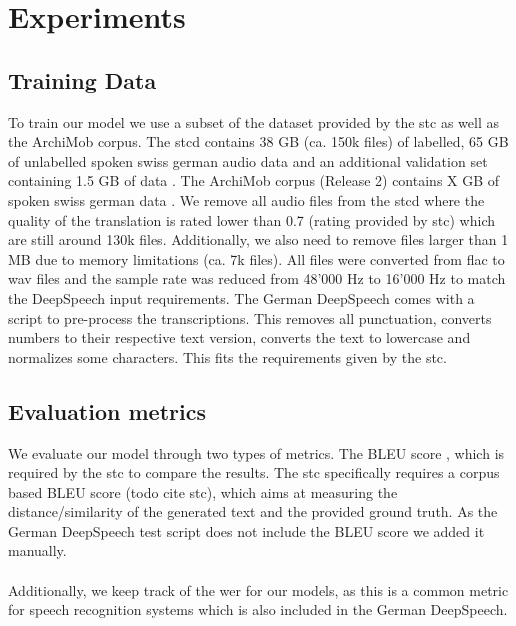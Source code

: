 \section{Experiments}

\subsection{Training Data}
To train our model we use a subset of the dataset provided by the \gls{stc} as well as the ArchiMob corpus. The \gls{stcd} contains 38 GB (ca. 150k files) of labelled, 65 GB of unlabelled spoken swiss german audio data and an additional validation set
containing 1.5 GB of data \cite{stc2019}. The ArchiMob corpus (Release 2) contains X GB of spoken swiss german data \cite{archimob2016}. We remove all audio files from the \gls{stcd} where the quality of the translation
is rated lower than 0.7 (rating provided by \gls{stc}) which are still around 130k files. Additionally, we also need to remove files larger than 1 MB due to memory limitations (ca. 7k files). All files were converted from flac to wav files and the sample rate was reduced from 48'000 Hz to 16'000 Hz to match the DeepSpeech input requirements.
The German DeepSpeech comes with a script to pre-process the transcriptions. This removes all punctuation, converts numbers to their respective text version, converts the text to lowercase and normalizes some characters. This fits the requirements given by the \gls{stc}.

\subsection{Evaluation metrics}
We evaluate our model through two types of metrics. The BLEU score \cite{Papineni2002BleuAM}, which is required by the \gls{stc} to compare the results. The \gls{stc} specifically requires a corpus
based BLEU score (todo cite stc), which aims at measuring the distance/similarity of the generated text and the provided ground truth. As the German DeepSpeech test script does not include the BLEU score we added it manually. \\~\\Additionally, we keep track of the \gls{wer} for our models, as
this is a common metric for speech recognition systems \cite{Park2008AnEA} which is also included in the German DeepSpeech.


